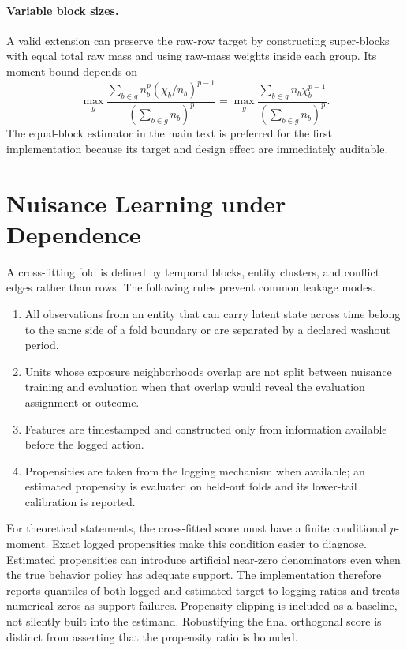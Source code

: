\paragraph{Variable block sizes.}
A valid extension can preserve the raw-row target by constructing super-blocks with equal total raw mass and using raw-mass weights inside each group. Its moment bound depends on
\begin{equation}
\max_g
\frac{\sum_{b\in g}n_b^p(\chi_b/n_b)^{p-1}}
     {(\sum_{b\in g}n_b)^p}
=
\max_g
\frac{\sum_{b\in g}n_b\chi_b^{p-1}}
     {(\sum_{b\in g}n_b)^p}.
\end{equation}
The equal-block estimator in the main text is preferred for the first implementation because its target and design effect are immediately auditable.

\section{Nuisance Learning under Dependence}
\label{app:nuisance}

A cross-fitting fold is defined by temporal blocks, entity clusters, and conflict edges rather than rows. The following rules prevent common leakage modes.
\begin{enumerate}[leftmargin=1.5em,itemsep=2pt]
    \item All observations from an entity that can carry latent state across time belong to the same side of a fold boundary or are separated by a declared washout period.
    \item Units whose exposure neighborhoods overlap are not split between nuisance training and evaluation when that overlap would reveal the evaluation assignment or outcome.
    \item Features are timestamped and constructed only from information available before the logged action.
    \item Propensities are taken from the logging mechanism when available; an estimated propensity is evaluated on held-out folds and its lower-tail calibration is reported.
\end{enumerate}

For theoretical statements, the cross-fitted score must have a finite conditional $p$-moment. Exact logged propensities make this condition easier to diagnose. Estimated propensities can introduce artificial near-zero denominators even when the true behavior policy has adequate support. The implementation therefore reports quantiles of both logged and estimated target-to-logging ratios and treats numerical zeros as support failures. Propensity clipping is included as a baseline, not silently built into the estimand. Robustifying the final orthogonal score is distinct from asserting that the propensity ratio is bounded.

